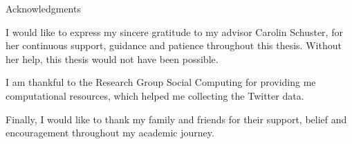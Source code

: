 \thispagestyle{empty}

\vspace*{20mm}

\begin{center}
    { Acknowledgments}
\end{center}

\vspace{10mm}

I would like to express my sincere gratitude to my advisor Carolin Schuster,
for her continuous support, guidance and patience throughout this thesis.
Without her help, this thesis would not have been possible.

I am thankful to the Research Group Social Computing for providing me
computational resources, which helped me collecting the Twitter data.  

Finally, I would like to thank my family and friends for their support,
belief and encouragement throughout my academic journey.


\cleardoublepage{}
